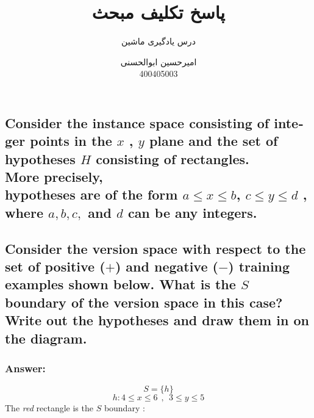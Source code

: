 \documentclass{article}
\title{پاسخ تکلیف مبحث
	\lr{Concept Learning}
}
\author{درس یادگیری ماشین}
\date{
	امیرحسین ابوالحسنی\\
	400405003
	}
\newcommand{\ap}[3]{\draw (#1,#2) node[scale=2] {#3};}
\newcommand{\mkrect}[5][black]{%
	\draw[#1,very thick] (#2,#3) rectangle (#4,#5);
}
\begin{document}
	\maketitle
	
	\begin{latin}
		\section{Consider the instance space consisting of integer points in the $x$ , $y$ plane and the
			set of hypotheses $H$ consisting of rectangles.\\
			More precisely,\\
			hypotheses are of the
			form $a \le x \le b$, $c \le y \le d$ , where $a , b, c,$ and $d$ can be any integers.}
			
			\subsection{Consider the version space with respect to the set of positive ($+$) and negative
				($-$) training examples shown below. What is the $S$ boundary of the version space
				in this case? Write out the hypotheses and draw them in on the diagram.}
				
				\subsubsection*{Answer:}			
				$$
				S = \{h\}
				$$
				$$
				h: 4 \le x \le 6 ~~ , ~~ 3 \le y \le 5
				$$
				The \textit{red} rectangle is the $S$ boundary :
						\begin{figure}[h!]
							\centering
						\end{figure}
			\newpage

\end{latin}
\end{document}
